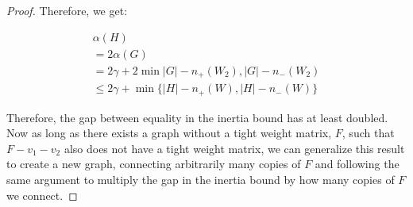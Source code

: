 \documentclass[12pt]{article}
\theoremstyle{parenbold}
\begin{document}
\begin{proof}
Therefore, we get:

\begin{center}
\begin{multline}
\alpha(H) \\ = 2\alpha(G) \\ = 2\gamma + 2\min{|G|-n_+(W_2), |G|-n_-(W_2)} \\ \leq 2\gamma + \min\{|H|-n_+(W), |H|-n_-(W)\}
\end{multline}
\end{center}

Therefore, the gap between equality in the inertia bound has at least doubled. Now as long as there exists a graph without a tight weight matrix, $F$, such that $F-v_1-v_2$ also does not have a tight weight matrix, we can generalize this result to create a new graph, connecting arbitrarily many copies of $F$ and following the same argument to multiply the gap in the inertia bound by how many copies of $F$ we connect.

\end{proof}



\end{document}
